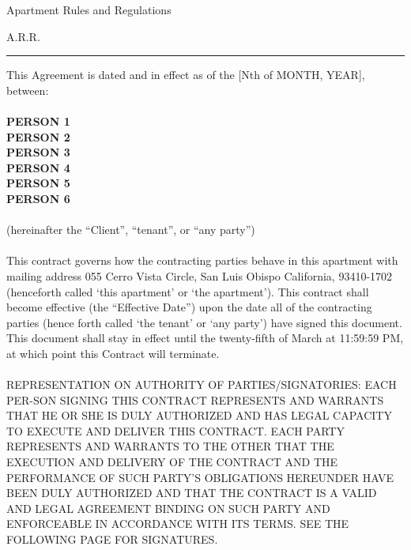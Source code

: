\documentclass[10pt]{article}
\begin{document}
	\begin{center}
		{\Large Apartment Rules and Regulations}
	\end{center}
\begin{center}
	
	{\normalsize  A.R.R.}
\end{center}
\hrule height .1mm

\vspace{.5cm}

\noindent This Agreement is dated and in effect as of the [Nth of MONTH, YEAR], between:\\
\\
{\bf PERSON 1}\\
{\bf PERSON 2}\\
{\bf PERSON 3}\\
{\bf PERSON 4}\\
{\bf PERSON 5}\\
{\bf PERSON 6}\\
\\(hereinafter the ``Client'', ``tenant'', or ``any party'')\\ \\

This contract governs how the contracting parties behave in this apartment with mailing address 055 Cerro Vista Circle, San Luis Obispo California, 93410-1702 (henceforth called ‘this apartment’ or ‘the apartment’). This contract shall become effective (the “Effective Date”) upon the date all of the contracting parties (hence forth called ‘the tenant’ or ‘any party’) have signed this document. This document shall stay in effect until the twenty-fifth of March at 11:59:59 PM, at which point this Contract will terminate.
\\ \\
\noindent REPRESENTATION ON AUTHORITY OF PARTIES/SIGNATORIES: EACH PER-SON SIGNING THIS CONTRACT REPRESENTS AND WARRANTS THAT HE OR SHE IS DULY AUTHORIZED AND HAS LEGAL CAPACITY TO EXECUTE AND DELIVER THIS CONTRACT. EACH PARTY REPRESENTS AND WARRANTS TO THE OTHER THAT THE EXECUTION AND DELIVERY OF THE CONTRACT AND THE PERFORMANCE OF SUCH PARTY’S OBLIGATIONS HEREUNDER HAVE BEEN DULY AUTHORIZED AND THAT THE CONTRACT IS A VALID AND LEGAL AGREEMENT BINDING ON SUCH PARTY AND ENFORCEABLE IN ACCORDANCE WITH ITS TERMS. SEE THE FOLLOWING PAGE FOR SIGNATURES.

\newpage
\end{document}
